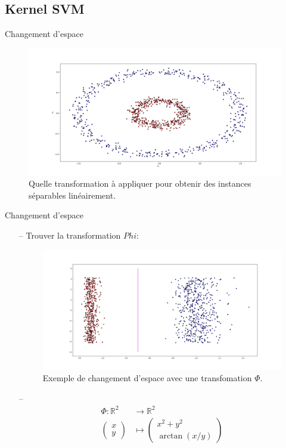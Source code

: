 \documentclass[9pt]{beamer}
\begin{document}
	\subsection[kernel]{Kernel SVM}

	\begin{frame}{Changement d'espace}
		\begin{figure}[H]
			\begin{center}
				\includegraphics[width=.7\textwidth]{circles}
				\caption{\label{fig::circles_3} Quelle transformation à appliquer pour obtenir des instances séparables linéairement.}
			\end{center}
		\end{figure}
	\end{frame}
	\begin{frame}{Changement d'espace}
		\begin{itemize}
			\item[--] Trouver la transformation $Phi$:
			\begin{figure}[H]
				\includegraphics[width=\textwidth]{separation_pol}
				\caption{\label{fig::kernel_polar} Exemple de changement d'espace avec une transfomation $\Phi$.}
			\end{figure}
			\item[--] \begin{align*}
				\Phi: \mathbb{R}^2 &\rightarrow \mathbb{R}^2 \\
				\begin{pmatrix}
					x \\
					y
				\end{pmatrix} &\mapsto \begin{pmatrix}
					x^2 + y^2 \\
					\arctan(x/y)
				\end{pmatrix}
			\end{align*}
		\end{itemize}
	\end{frame}
\end{document}

